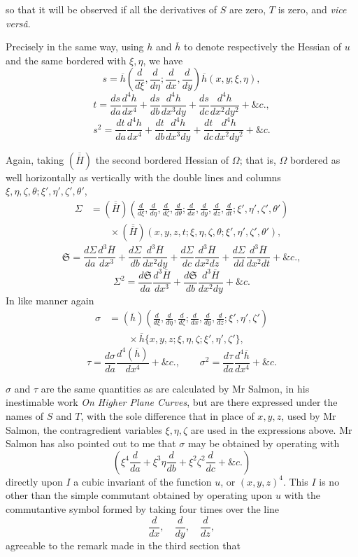 \documentclass[11pt]{article}
\newcommand{\sourcepage}[1]{\marginpar{\scriptsize p.~#1}}
\begin{document}
\sourcepage{330}
so that it will be observed if all the derivatives of $S$ are zero, $T$ is zero, and \emph{vice versâ}.

Precisely in the same way, using $h$ and $\overline h$ to denote respectively the Hessian of $u$ and the same bordered with $\xi,\eta$, we have
\[
s=\overline h\!\left(\frac{d}{d\xi},\frac{d}{d\eta};
\frac{d}{dx},\frac{d}{dy}\right)\overline h(x,y;\xi,\eta),
\]
\[
t=\frac{ds}{da}\frac{d^4h}{dx^4}
+\frac{ds}{db}\frac{d^4h}{dx^3dy}
+\frac{ds}{dc}\frac{d^4h}{dx^2dy^2}+\&c.,
\]
\[
s^2=\frac{dt}{da}\frac{d^4h}{dx^4}
+\frac{dt}{db}\frac{d^4h}{dx^3dy}
+\frac{dt}{dc}\frac{d^4h}{dx^2dy^2}+\&c.
\]

Again, taking $(\overline{\overline H})$ the second bordered Hessian of $\Omega$; that is, $\Omega$ bordered as well horizontally as vertically with the double lines and columns $\xi,\eta,\zeta,\theta;\xi',\eta',\zeta',\theta'$,
\[
\begin{aligned}
\Sigma&=(\overline{\overline H})\!\left(
\frac{d}{d\xi},\frac{d}{d\eta},\frac{d}{d\zeta},\frac{d}{d\theta};
\frac{d}{dx},\frac{d}{dy},\frac{d}{dz},\frac{d}{dt};
\xi',\eta',\zeta',\theta'\right)\\
&\qquad{}\times
(\overline{\overline H})(x,y,z,t;\xi,\eta,\zeta,\theta;\xi',\eta',\zeta',\theta'),
\end{aligned}
\]
\[
\mathfrak{S}=\frac{d\Sigma}{da}\frac{d^3\overline H}{dx^3}
+\frac{d\Sigma}{db}\frac{d^3\overline H}{dx^2dy}
+\frac{d\Sigma}{dc}\frac{d^3\overline H}{dx^2dz}
+\frac{d\Sigma}{dd}\frac{d^3\overline H}{dx^2dt}+\&c.,
\]
\[
\Sigma^2=\frac{d\mathfrak{S}}{da}\frac{d^3\overline H}{dx^3}
+\frac{d\mathfrak{S}}{db}\frac{d^3\overline H}{dx^2dy}+\&c.
\]
In like manner again
\[
\begin{aligned}
\sigma&=(\overline h)\!\left(
\frac{d}{d\xi},\frac{d}{d\eta},\frac{d}{d\zeta};
\frac{d}{dx},\frac{d}{dy},\frac{d}{dz};
\xi',\eta',\zeta'\right)\\
&\qquad{}\times
\overline h\{x,y,z;\xi,\eta,\zeta;\xi',\eta',\zeta'\},
\end{aligned}
\]
\[
\tau=\frac{d\sigma}{da}\frac{d^4(\overline h)}{dx^4}+\&c.,
\qquad
\sigma^2=\frac{d\tau}{da}\frac{d^4\overline h}{dx^4}+\&c.
\]

$\sigma$ and $\tau$ are the same quantities as are calculated by Mr Salmon, in his inestimable work \emph{On Higher Plane Curves}, but are there expressed under the names of $S$ and $T$, with the sole difference that in place of $x,y,z$, used by Mr Salmon, the contragredient variables $\xi,\eta,\zeta$ are used in the expressions above. Mr Salmon has also pointed out to me that $\sigma$ may be obtained by operating with
\[
\left(\xi^4\frac{d}{da}+\xi^3\eta\frac{d}{db}
+\xi^2\zeta^2\frac{d}{dc}+\&c.\right)
\]
directly upon $I$ a cubic invariant of the function $u$, or $(x,y,z)^4$. This $I$ is no other than the simple commutant obtained by operating upon $u$ with the commutantive symbol formed by taking four times over the line
\[
\frac{d}{dx},\quad \frac{d}{dy},\quad \frac{d}{dz},
\]
agreeable to the remark made in the third section that
\end{document}
